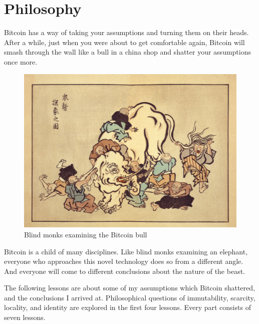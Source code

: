 \part{Philosophy}
\label{ch:philosophy}

%

Bitcoin has a way of taking your assumptions and turning them on their heads.
After a while, just when you were about to get comfortable again, Bitcoin will
smash through the wall like a bull in a china shop and shatter your assumptions
once more.

\begin{figure}
  \includegraphics{assets/images/blind-monks.jpg}
  \caption{Blind monks examining the Bitcoin bull}
  \label{fig:blind-monks}
\end{figure}

Bitcoin is a child of many disciplines. Like blind monks examining an elephant,
everyone who approaches this novel technology does so from a different angle.
And everyone will come to different conclusions about the nature of the beast.

The following lessons are about some of my assumptions which Bitcoin shattered,
and the conclusions I arrived at. Philosophical questions of immutability,
scarcity, locality, and identity are explored in the first four lessons.  Every
part consists of seven lessons.

